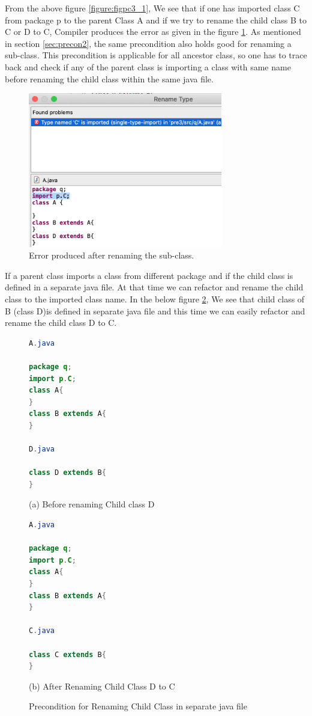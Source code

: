 From the above figure \ref{figure:figpc3_1}, We see that if one has imported class C from  package  p to the parent Class A and if we try to rename the child class B to C or D to C, Compiler produces  the error as given in the figure \ref{figure:figpc3_2}. As mentioned in  section \ref{sec:precon2}, the same precondition also holds good for renaming a sub-class. This precondition is applicable for all ancestor class, so one has to trace back and check if any of the parent class is importing a class with same name before renaming the child class within the same java file.
\begin{figure}[htbp]
\centerline{\includegraphics[width=85mm,scale=0.5]{precond3.png}}
\caption{Error produced after renaming the sub-class.}
\label{figure:figpc3_2}
\end{figure}

If a parent class imports a class from different package and if the child class is defined in a separate java file. At that time we can refactor and rename the child class to the imported class name.
In the below figure \ref{figure:figpc3_3}, We see that child class of B (class D)is defined in separate java file and this time we can easily refactor and rename the child class D to C.
\begin{figure}[th]
\centering
\begin{minipage}[t]{0.45\linewidth}
\begin{lstlisting}[language=java, basicstyle=\scriptsize\ttfamily,frame=single]	
A.java

package q;
import p.C;
class A{	
}
class B extends A{	
}

D.java

class D extends B{
}
\end{lstlisting}
\tiny{(a) Before renaming Child class D}
\end{minipage}
\hfill
\begin{minipage}[t]{0.45\linewidth}
\begin{lstlisting}[language=java, basicstyle=\scriptsize\ttfamily,frame=single]
A.java

package q;
import p.C;
class A{	
}
class B extends A{	
}

C.java

class C extends B{
}	
\end{lstlisting}
\tiny{(b) After Renaming Child Class D to C}
\end{minipage}
\caption{Precondition for Renaming Child Class in separate java file}
\label{figure:figpc3_3}
\end{figure}